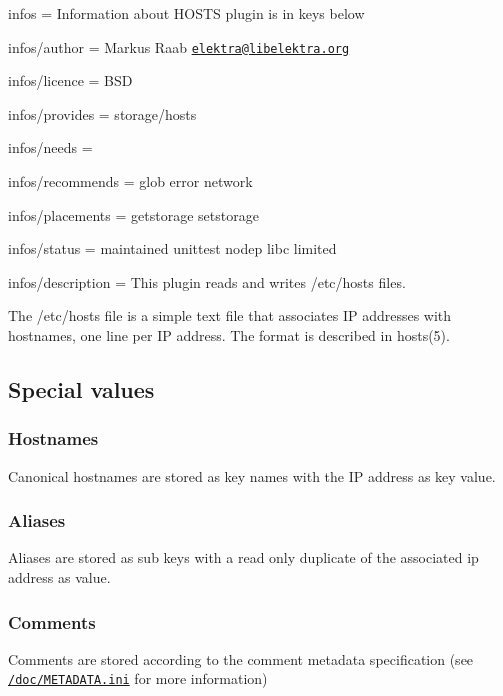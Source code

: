 
\begin{DoxyItemize}
\item infos = Information about H\+O\+S\+T\+S plugin is in keys below
\item infos/author = Markus Raab \href{mailto:elektra@libelektra.org}{\tt elektra@libelektra.\+org}
\item infos/licence = B\+S\+D
\item infos/provides = storage/hosts
\item infos/needs =
\item infos/recommends = glob error network
\item infos/placements = getstorage setstorage
\item infos/status = maintained unittest nodep libc limited
\item infos/description = This plugin reads and writes /etc/hosts files.
\end{DoxyItemize}

The {\ttfamily /etc/hosts} file is a simple text file that associates I\+P addresses with hostnames, one line per I\+P address. The format is described in {\ttfamily hosts(5)}.

\subsection*{Special values}

\subsubsection*{Hostnames}

Canonical hostnames are stored as key names with the I\+P address as key value.

\subsubsection*{Aliases}

Aliases are stored as sub keys with a read only duplicate of the associated ip address as value.

\subsubsection*{Comments}

Comments are stored according to the comment metadata specification (see \href{/home/markus/Projekte/Elektra/current/doc/METADATA.ini}{\tt /doc/\+M\+E\+T\+A\+D\+A\+T\+A.ini} for more information)

